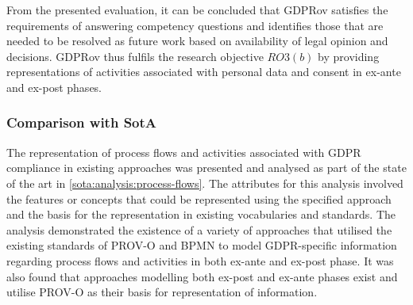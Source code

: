 From the presented evaluation, it can be concluded that GDPRov satisfies the requirements of answering  competency questions and identifies those that are needed to be resolved as future work based on availability of legal opinion and decisions. GDPRov thus fulfils the research objective $RO3(b)$ by providing representations of activities associated with personal data and consent in ex-ante and ex-post phases.

\subsubsection{Comparison with SotA}
The representation of process flows and activities associated with GDPR compliance in existing approaches was presented and analysed as part of the state of the art in \autoref{sota:analysis:process-flows}.
The attributes for this analysis involved the features or concepts that could be represented using the specified approach and the basis for the representation in existing vocabularies and standards.
The analysis demonstrated the existence of a variety of approaches that utilised the existing standards of PROV-O and BPMN to model GDPR-specific information regarding process flows and activities in both ex-ante and ex-post phase. It was also found that approaches modelling both ex-post and ex-ante phases exist and utilise PROV-O as their basis for representation of information.

